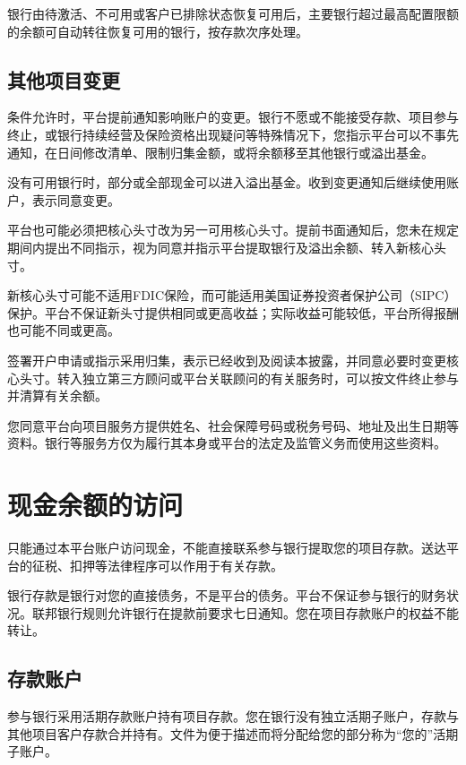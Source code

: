 \documentclass[UTF8,fontset=none,11pt,a4paper]{ctexart}
\begin{document}
银行由待激活、不可用或客户已排除状态恢复可用后，主要银行超过最高配置限额的余额可自动转往恢复可用的银行，按存款\allowbreak\mbox{次序处理。}


\subsection*{其他项目变更}
条件允许时，平台提前通知影响账户的变更。银行不愿或不能接受存款、项目参与终止，或银行持续经营及保险资格出现疑问等特殊情况下，您指示平台可以不事先通知，在日间修改清单、限制归集金额，或将余额移至其他银行或\allowbreak\mbox{溢出基金。}


没有可用银行时，部分或全部现金可以进入溢出基金。收到变更通知后继续使用账户，表示\allowbreak\mbox{同意变更。}


平台也可能必须把核心头寸改为另一可用核心头寸。提前书面通知后，您未在规定期间内提出不同指示，视为同意并指示平台提取银行及溢出余额、转入新\allowbreak\mbox{核心头寸。}


新核心头寸可能不适用FDIC保险，而可能适用美国证券投资者保护公司（SIPC）保护。平台不保证新头寸提供相同或更高收益；实际收益可能较低，平台所得报酬也可能不同\allowbreak\mbox{或更高。}


签署开户申请或指示采用归集，表示已经收到及阅读本披露，并同意必要时变更核心头寸。转入独立第三方顾问或平台关联顾问的有关服务时，可以按文件终止参与并清算\allowbreak\mbox{有关余额。}


您同意平台向项目服务方提供姓名、社会保障号码或税务号码、地址及出生日期等资料。银行等服务方仅为履行其本身或平台的法定及监管义务而使用这\allowbreak\mbox{些资料。}


\section*{现金余额的访问}
只能通过本平台账户访问现金，不能直接联系参与银行提取您的项目存款。送达平台的征税、扣押等法律程序可以作用于\allowbreak\mbox{有关存款。}


银行存款是银行对您的直接债务，不是平台的债务。平台不保证参与银行的财务状况。联邦银行规则允许银行在提款前要求七日通知。您在项目存款账户的权益\allowbreak\mbox{不能转让。}


\subsection*{存款账户}
参与银行采用活期存款账户持有项目存款。您在银行没有独立活期子账户，存款与其他项目客户存款合并持有。文件为便于描述而将分配给您的部分称为“您的”活\allowbreak\mbox{期子账户。}
\end{document}
